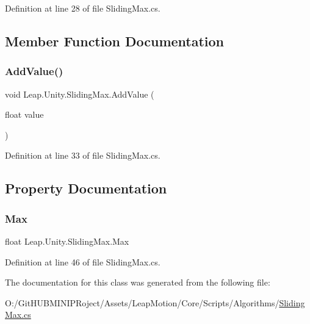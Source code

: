 Definition at line 28 of file Sliding\+Max.\+cs.



\subsection{Member Function Documentation}
\mbox{\label{class_leap_1_1_unity_1_1_sliding_max_ad28b8d2d4f9d4f678bfbc83162991763}} 
\subsubsection{\texorpdfstring{AddValue()}{AddValue()}}
{\footnotesize\ttfamily void Leap.\+Unity.\+Sliding\+Max.\+Add\+Value (\begin{DoxyParamCaption}\item[{float}]{value }\end{DoxyParamCaption})}



Definition at line 33 of file Sliding\+Max.\+cs.



\subsection{Property Documentation}
\mbox{\label{class_leap_1_1_unity_1_1_sliding_max_a2c891c2afafcc4fdac884447491292b1}} 
\subsubsection{\texorpdfstring{Max}{Max}}
{\footnotesize\ttfamily float Leap.\+Unity.\+Sliding\+Max.\+Max\hspace{0.3cm}{\ttfamily [get]}}



Definition at line 46 of file Sliding\+Max.\+cs.



The documentation for this class was generated from the following file\+:\begin{DoxyCompactItemize}
\item 
O\+:/\+Git\+H\+U\+B\+M\+I\+N\+I\+P\+Roject/\+Assets/\+Leap\+Motion/\+Core/\+Scripts/\+Algorithms/\mbox{\hyperlink{_sliding_max_8cs}{Sliding\+Max.\+cs}}\end{DoxyCompactItemize}

